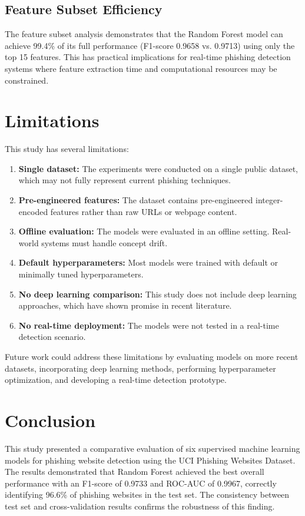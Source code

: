\documentclass[conference]{IEEEtran}
\begin{document}
\subsection{Feature Subset Efficiency}

The feature subset analysis demonstrates that the Random Forest model can achieve 99.4\% of its full performance (F1-score 0.9658 vs. 0.9713) using only the top 15 features. This has practical implications for real-time phishing detection systems where feature extraction time and computational resources may be constrained.

\section{Limitations}

This study has several limitations:

\begin{enumerate}
    \item \textbf{Single dataset:} The experiments were conducted on a single public dataset, which may not fully represent current phishing techniques.
    \item \textbf{Pre-engineered features:} The dataset contains pre-engineered integer-encoded features rather than raw URLs or webpage content.
    \item \textbf{Offline evaluation:} The models were evaluated in an offline setting. Real-world systems must handle concept drift.
    \item \textbf{Default hyperparameters:} Most models were trained with default or minimally tuned hyperparameters.
    \item \textbf{No deep learning comparison:} This study does not include deep learning approaches, which have shown promise in recent literature.
    \item \textbf{No real-time deployment:} The models were not tested in a real-time detection scenario.
\end{enumerate}

Future work could address these limitations by evaluating models on more recent datasets, incorporating deep learning methods, performing hyperparameter optimization, and developing a real-time detection prototype.

\section{Conclusion}

This study presented a comparative evaluation of six supervised machine learning models for phishing website detection using the UCI Phishing Websites Dataset. The results demonstrated that Random Forest achieved the best overall performance with an F1-score of 0.9733 and ROC-AUC of 0.9967, correctly identifying 96.6\% of phishing websites in the test set. The consistency between test set and cross-validation results confirms the robustness of this finding.
\end{document}
